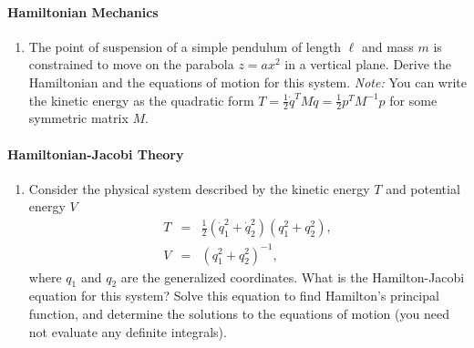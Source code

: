 \documentclass[letterpaper,11pt]{article}
\begin{document}
\paragraph*{Hamiltonian Mechanics}
\begin{enumerate}[resume]
 \item The point of suspension of a simple pendulum of length $\ell$ and mass $m$ is constrained to move on the parabola $z = a x^2$ in a vertical plane.  Derive the Hamiltonian and the equations of motion for this system.  \textit{Note:} You can write the kinetic energy as the quadratic form $T = \frac{1}{2} \dot{q}^T M \dot{q} = \frac{1}{2} p^T M^{-1} p$ for some symmetric matrix $M$.
\end{enumerate}

\paragraph*{Hamiltonian-Jacobi Theory}
\begin{enumerate}[resume]
 \item Consider the physical system described by the kinetic energy $T$ and potential energy $V$
 \begin{eqnarray*}
  T & = & \frac{1}{2} (\dot{q}_1^2 + \dot{q}_2^2) (q_1^2 + q_2^2), \\
  V & = & (q_1^2 + q_2^2)^{-1},
 \end{eqnarray*}
 where $q_1$ and $q_2$ are the generalized coordinates.  What is the Hamilton-Jacobi equation for this system?  Solve this equation to find Hamilton's principal function, and determine the solutions to the equations of motion (you need not evaluate any definite integrals).
\end{enumerate}
\end{document}
